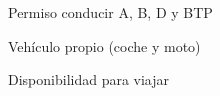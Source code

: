 

\begin{cventries}

  \cventry
    {} %
    {} %
    {} %
    {} %
    {
      \begin{cvitems} %
        \item {Permiso conducir A, B, D y BTP}
        \item {Vehículo propio (coche y moto)}
        \item {Disponibilidad para viajar}
      \end{cvitems}
    }

\end{cventries}
